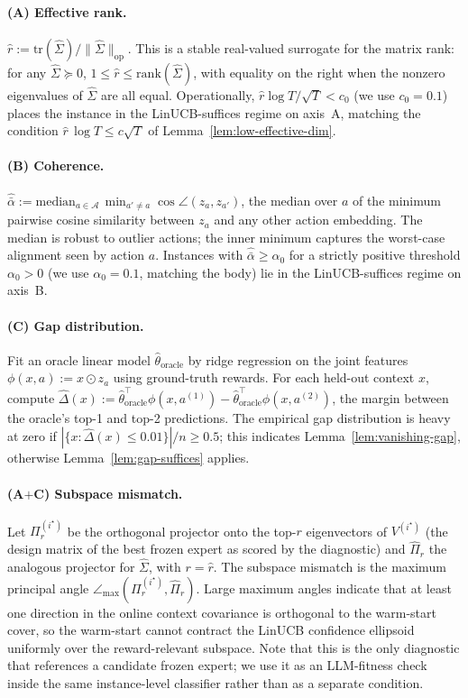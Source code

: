 \documentclass{article}
\theoremstyle{definition}
\theoremstyle{remark}
\theoremstyle{remark}
\begin{document}
\paragraph{(A) Effective rank.}
$\widehat r := \mathrm{tr}(\widehat\Sigma)/\|\widehat\Sigma\|_{\mathrm{op}}$.
This is a stable real-valued surrogate for the matrix rank: for any
$\widehat\Sigma\succeq 0$, $1\le\widehat r\le\mathrm{rank}(\widehat\Sigma)$,
with equality on the right when the nonzero eigenvalues of
$\widehat\Sigma$ are all equal. Operationally,
$\widehat r\log T/\sqrt T < c_0$ (we use $c_0=0.1$)
places the instance in the LinUCB-suffices regime on axis~A,
matching the condition
$\widehat r\,\log T \le c\sqrt T$ of Lemma~\ref{lem:low-effective-dim}.

\paragraph{(B) Coherence.}
$\widehat{\bar\alpha} := \mathrm{median}_{a\in\mathcal A}\,
\min_{a'\ne a}\cos\angle(z_a,z_{a'})$, the median over $a$ of the
minimum pairwise cosine similarity between $z_a$ and any other action
embedding. The median is robust to outlier actions; the inner minimum
captures the worst-case alignment seen by action $a$. Instances with
$\widehat{\bar\alpha}\ge\alpha_0$ for a strictly positive threshold
$\alpha_0>0$ (we use $\alpha_0=0.1$, matching the body) lie in the
LinUCB-suffices regime on axis~B.

\paragraph{(C) Gap distribution.}
Fit an oracle linear model $\widehat\theta_{\mathrm{oracle}}$ by
ridge regression on the joint features $\phi(x,a) := x\odot z_a$
using ground-truth rewards. For each held-out context $x$, compute
$\widehat\Delta(x) := \widehat\theta_{\mathrm{oracle}}^\top
\phi(x,a^{(1)}) - \widehat\theta_{\mathrm{oracle}}^\top\phi(x,a^{(2)})$,
the margin between the oracle's top-1 and top-2 predictions. The
empirical gap distribution is heavy at zero if
$|\{x:\widehat\Delta(x)\le 0.01\}|/n \ge 0.5$; this indicates
Lemma~\ref{lem:vanishing-gap}, otherwise Lemma~\ref{lem:gap-suffices}
applies.

\paragraph{(A$+$C) Subspace mismatch.}
Let $\Pi^{(i^\star)}_r$ be the orthogonal projector onto the top-$r$
eigenvectors of $V^{(i^\star)}$ (the design matrix of the best frozen
expert as scored by the diagnostic) and $\widehat\Pi_r$ the analogous
projector for $\widehat\Sigma$, with $r=\widehat r$. The subspace
mismatch is the maximum principal angle
$\angle_{\max}(\Pi^{(i^\star)}_r,\widehat\Pi_r)$. Large maximum angles
indicate that at least one direction in the online context covariance
is orthogonal to the warm-start cover, so the warm-start cannot
contract the LinUCB confidence ellipsoid uniformly over the
reward-relevant subspace. Note that this is the only diagnostic that
references a candidate frozen expert; we use it as an LLM-fitness
check inside the same instance-level classifier rather than as a
separate condition.
\end{document}
